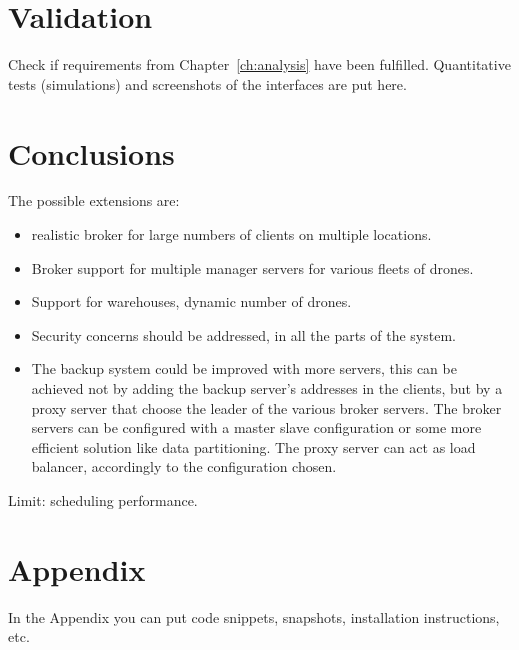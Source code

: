 \documentclass[a4paper, oneside]{memoir}
\begin{document}
\chapter{Validation}

Check if requirements from Chapter~\ref{ch:analysis} have been fulfilled.
Quantitative tests (simulations) and screenshots of the interfaces are put here.


\chapter{Conclusions}

The possible extensions are:
\begin{itemize}
	\item realistic broker for large numbers of clients on multiple locations.
	\item Broker support for multiple manager servers for various fleets of drones.
	\item Support for warehouses, dynamic number of drones.
	\item Security concerns should be addressed, in all the parts of the system.
	\item The backup system could be improved with more servers, this can be achieved not by adding the backup server's addresses in the clients, but by a proxy server that choose the leader of the various broker servers. The broker servers can be configured with a master slave configuration or some more efficient solution like data partitioning. The proxy server can act as load balancer, accordingly to the configuration chosen.
\end{itemize}

Limit: scheduling performance.
\appendix

\chapter{Appendix}

In the Appendix you can put code snippets, snapshots, installation instructions, etc.
\end{document}
